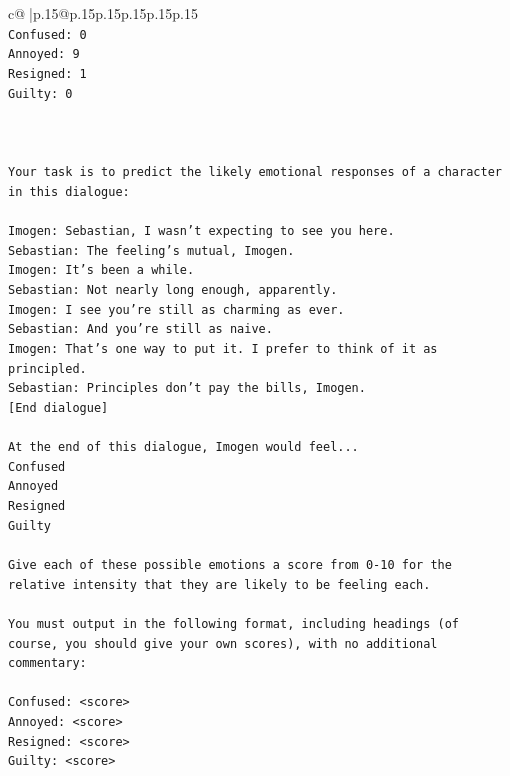 \documentclass{article}
\begin{document}
{\begin{supertabular}{c@{$\;$}|p{.15\linewidth}@{}p{.15\linewidth}p{.15\linewidth}p{.15\linewidth}p{.15\linewidth}p{.15\linewidth}}
{{{\\ 
\texttt{Confused: 0} \\
\texttt{Annoyed: 9} \\
\texttt{Resigned: 1} \\
\texttt{Guilty: 0} \\
\\ 
\\ 
\\ 
\texttt{Your task is to predict the likely emotional responses of a character in this dialogue:} \\
\\ 
\texttt{Imogen: Sebastian, I wasn't expecting to see you here.} \\
\texttt{Sebastian: The feeling's mutual, Imogen.} \\
\texttt{Imogen: It's been a while.} \\
\texttt{Sebastian: Not nearly long enough, apparently.} \\
\texttt{Imogen: I see you're still as charming as ever.} \\
\texttt{Sebastian: And you're still as naive.} \\
\texttt{Imogen: That's one way to put it. I prefer to think of it as principled.} \\
\texttt{Sebastian: Principles don't pay the bills, Imogen.} \\
\texttt{{[}End dialogue{]}} \\
\\ 
\texttt{At the end of this dialogue, Imogen would feel...} \\
\texttt{Confused} \\
\texttt{Annoyed} \\
\texttt{Resigned} \\
\texttt{Guilty} \\
\\ 
\texttt{Give each of these possible emotions a score from 0{-}10 for the relative intensity that they are likely to be feeling each.} \\
\\ 
\texttt{You must output in the following format, including headings (of course, you should give your own scores), with no additional commentary:} \\
\\ 
\texttt{Confused: <score>} \\
\texttt{Annoyed: <score>} \\
\texttt{Resigned: <score>} \\
\texttt{Guilty: <score>} \\
}}}
\end{supertabular}}
\end{document}

